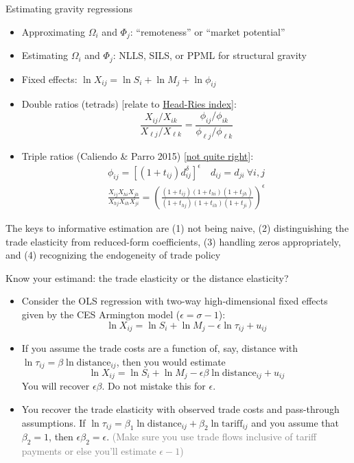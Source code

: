 \documentclass[10pt,notes=hide,aspectratio=169]{beamer}
\begin{document}
\begin{frame}{Estimating gravity regressions}
\begin{itemize}
	\item Approximating $\Omega_i$ and $\Phi_j$: ``remoteness'' or ``market potential''
	\item Estimating $\Omega_i$ and $\Phi_j$: NLLS, SILS, or PPML for structural gravity
	\item Fixed effects:
	$\ln X_{ij} = \ln S_i + \ln M_j + \ln \phi_{ij}$
	\item Double ratios (tetrads) [relate to \href{http://www-personal.umich.edu/~alandear/glossary/h.html}{Head-Ries index}]:
	\begin{equation*}
	\frac{X_{ij}/X_{ik}}{X_{\ell j}/X_{\ell k}} = \frac{\phi_{ij}/\phi_{ik}}{\phi_{\ell j}/\phi_{\ell k}} 
	\end{equation*}
	\item Triple ratios (Caliendo \& Parro 2015) [\href{https://tradediversion.net/2020/04/26/do-customs-duties-compound-non-tariff-trade-costs-not-in-the-us/}{not quite right}]:
	\begin{align*}
	\phi_{ij} = [(1+t_{ij})d_{ij}^\delta]^{\epsilon} \quad d_{ij}=d_{ji} \ \forall  i,j \\
	\frac{X_{ij}X_{hi}X_{jh}}{X_{hj}X_{ih}X_{ji}}
	=
	\left(
	\frac{(1+t_{ij})(1+t_{hi})(1+t_{jh})}{(1+t_{hj})(1+t_{ih})(1+t_{ji})} 
	\right)^{\epsilon}
	\end{align*}
\end{itemize}
The keys to informative estimation are (1) not being naive, (2) distinguishing the trade elasticity from reduced-form coefficients, (3) handling zeros appropriately, and (4) recognizing the endogeneity of trade policy
\end{frame}
\begin{frame}{Know your estimand: the trade elasticity or the distance elasticity?}
\begin{itemize}
\item
Consider the OLS regression with two-way high-dimensional fixed effects given by the CES Armington model ($\epsilon = \sigma -1$):
$$\ln X_{ij} = \ln S_i + \ln M_j - \epsilon \ln \tau_{ij} + u_{ij}$$
\item
If you assume the trade costs are a function of, say, distance with 
$\ln \tau_{ij} = \beta \ln \text{distance}_{ij}$,
then you would estimate
$$\ln X_{ij} = \ln S_i + \ln M_j - \epsilon \beta \ln \text{distance}_{ij} + u_{ij}$$
You will recover $\epsilon \beta$. Do not mistake this for $\epsilon$.
\item
You recover the trade elasticity with observed trade costs and pass-through assumptions.
If $\ln \tau_{ij} = \beta_1 \ln \text{distance}_{ij} + \beta_2 \ln \text{tariff}_{ij}$
and you assume that $\beta_2 = 1$, then $\epsilon \beta_2 = \epsilon$.
\textcolor{gray}{(Make sure you use trade flows inclusive of tariff payments or else you'll estimate $\epsilon - 1$)}
\end{itemize}
\end{frame}
\end{document}
